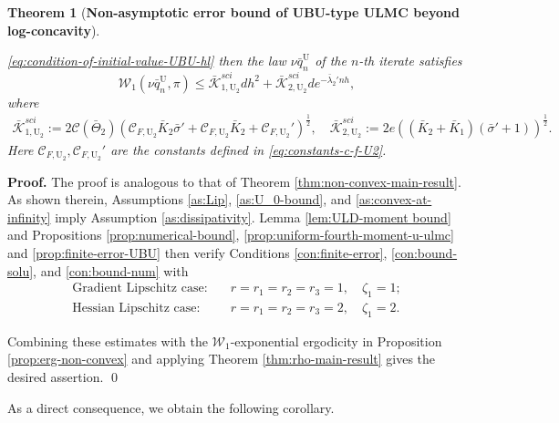 \documentclass[12pt]{article}
\newenvironment{redtext}
  {\color{black}\ignorespaces}
  {\ignorespacesafterend}
\numberwithin{equation}{section}
\renewenvironment{proof}%
  {\begin{trivlist}%
   \item[]\ignorespaces}%
  {\qed\end{trivlist}}
\newtheorem{thm}{Theorem}[section]
\newtheorem{prop}{Proposition}[section]
\begin{document}
\begin{redtext}
\begin{thm}[\textbf{Non-asymptotic error bound of UBU-type ULMC beyond log-concavity}]
\begin{enumerate}
\eqref{eq:condition-of-initial-value-UBU-hl}
then the law
\(\nu\bar q^\mathrm{U}_n\) of the \(n\)-th iterate
satisfies
\begin{equation}
\label{eq:non-convex-main-result-UBU-hl}
\mathcal W_1
\left(
\nu\bar q^\mathrm{U}_n,
\pi
\right)
\leq
\bar{\mathcal K}_{1,\mathrm{U}_2}^{sci}
d h^2
+
\bar{\mathcal K}_{2,\mathrm{U}_2}^{sci}
d
e^{-\bar\lambda_2'nh},
\end{equation}
where
\begin{align*}
\bar{\mathcal K}_{1,\mathrm{U}_2}^{sci}
:={}
2
\mathcal C(\bar\Theta_2)
\left(
\mathcal C_{F,\mathrm{U}_2}\bar K_2\bar\sigma' 
+
\mathcal C_{F,\mathrm{U}_2}\bar K_2
+
\mathcal C_{F,\mathrm{U}_2}'
\right)^{\frac12},
\quad
\bar{\mathcal K}_{2,\mathrm{U}_2}^{sci}
:=
2e
\left(
(\bar K_2+\bar K_1)
(\bar\sigma' +1)
\right)^{\frac12}.
\end{align*}
Here \(\mathcal C_{F,\mathrm{U}_2},\mathcal C_{F,\mathrm{U}_2}'\) are the constants defined in \eqref{eq:constants-c-f-U2}.
\end{enumerate}


\end{thm}

\begin{proof}
\textbf{Proof.}
The proof is analogous to that of Theorem
\ref{thm:non-convex-main-result}. As shown therein,
Assumptions \ref{as:Lip}, \ref{as:U_0-bound}, and
\ref{as:convex-at-infinity} imply Assumption
\ref{as:dissipativity}. Lemma \ref{lem:ULD-moment bound} and
Propositions \ref{prop:numerical-bound}, \ref{prop:uniform-fourth-moment-u-ulmc} and
\ref{prop:finite-error-UBU} then verify Conditions
\ref{con:finite-error}, \ref{con:bound-solu}, and
\ref{con:bound-num} with
\begin{align}
\text{Gradient Lipschitz case}:&
\quad
r=r_1=r_2=r_3=1,
\quad
\zeta_1=1; \\
\text{Hessian Lipschitz case}:&
\quad
r=r_1=r_2=r_3=2,
\quad
\zeta_1=2.
\end{align}

Combining these estimates with the
\(\mathcal W_1\)-exponential ergodicity in Proposition
\ref{prop:erg-non-convex} and applying Theorem
\ref{thm:rho-main-result} gives the desired assertion.
\end{proof}

As a direct consequence, we obtain the following corollary.



\end{redtext}
\end{document}
